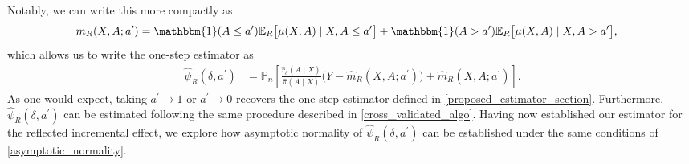 \documentclass[11pt,twoside]{article}
\theoremstyle{definition}
\theoremstyle{remark}
\begin{document}
Notably, we can write this more compactly as
\begin{align*}
  m_R(X, A; a^{\prime})
  &= \mathbbm{1}(A \le a^{\prime})
        \mathbb{E}_R\big[\mu(X, A) \mid X, A \le a^{\prime}\big] +
      \mathbbm{1}(A > a^{\prime})
        \mathbb{E}_R\big[\mu(X, A) \mid X, A > a^{\prime}\big],
\end{align*}
which allows us to write the one-step estimator as
\begin{align*}
  \widehat\psi_R(\delta, a^{\prime})
  &= \mathbb{P}_n \left[
    \frac{\widehat r_\delta(A \mid X)}{\widehat\pi(A \mid X)}
      \Big(Y - \widehat m_R(X, A; a^{\prime})\Big)
    + \widehat m_R(X, A; a^{\prime})
  \right].
\end{align*}
As one would expect, taking $a^{\prime} \to 1$ or $a^{\prime} \to 0$ recovers the one-step estimator defined in \cref{proposed_estimator_section}. Furthermore, $\widehat{\psi}_R(\delta, a^{\prime})$ can be estimated following the same procedure described in \cref{cross_validated_algo}. Having now established our estimator for the reflected incremental effect, we explore how asymptotic normality of $\widehat{\psi}_R(\delta, a^{\prime})$ can be established under the same conditions of \cref{asymptotic_normality}.
\end{document}
